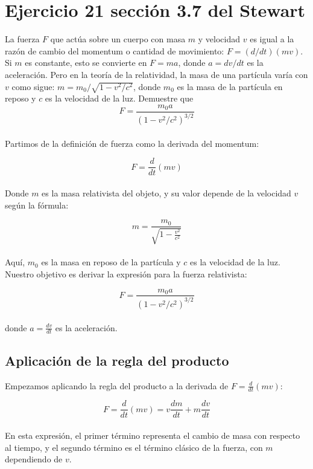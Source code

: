 \documentclass[11pt,letterpaper]{article}
\begin{document}
\section*{Ejercicio 21 sección 3.7 del Stewart}
La fuerza $F$ que actúa sobre un cuerpo con masa $m$ y velocidad $v$ es igual a la razón de cambio del momentum o cantidad
 de movimiento: $F = (d/dt)(mv)$. Si $m$ es constante, esto se convierte en $F = ma$, donde $a = dv/dt$ es la aceleración. Pero en la teoría de la relatividad, la masa de una partícula varía con
 $v$ como sigue: $m = m_0/\sqrt{1 - v^2/c^2}$, donde $m_0$ es la masa de la partícula en reposo y $c$ es la velocidad de la luz. Demuestre que
 \begin{equation*}
  F = \frac{m_0 a}{(1 - v^2 / c^2)^{3/2}}
  \end{equation*}
\\Partimos de la definición de fuerza como la derivada del momentum:

  \begin{equation}
      F = \frac{d}{dt}(mv)
  \end{equation}
\\Donde \( m \) es la masa relativista del objeto, y su valor depende de la velocidad \( v \) según la fórmula:
  
  \begin{equation}
      m = \frac{m_0}{\sqrt{1 - \frac{v^2}{c^2}}}
  \end{equation}
\\Aquí, \( m_0 \) es la masa en reposo de la partícula y \( c \) es la velocidad de la luz. Nuestro objetivo es derivar la expresión para la fuerza relativista:
  
  \[
      F = \frac{m_0 a}{(1 - v^2/c^2)^{3/2}}
  \]
\\donde \( a = \frac{dv}{dt} \) es la aceleración.
  
  \subsection*{Aplicación de la regla del producto}
  
Empezamos aplicando la regla del producto a la derivada de \( F = \frac{d}{dt}(mv) \):
  
  \begin{equation}
      F = \frac{d}{dt}(mv) = v \frac{dm}{dt} + m \frac{dv}{dt}
  \end{equation}
  \\En esta expresión, el primer término representa el cambio de masa con respecto al tiempo, y el segundo término es el término clásico de la fuerza, con \( m \) dependiendo de \( v \).
  
\end{document}

